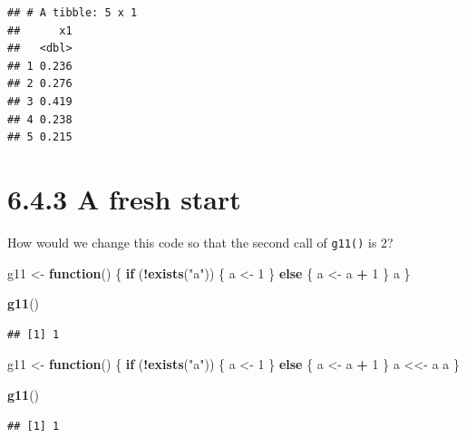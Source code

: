 \documentclass[]{book}
\newenvironment{Shaded}{\begin{snugshade}}{\end{snugshade}}
\newcommand{\ControlFlowTok}[1]{\textcolor[rgb]{0.13,0.29,0.53}{\textbf{#1}}}
\newcommand{\DecValTok}[1]{\textcolor[rgb]{0.00,0.00,0.81}{#1}}
\newcommand{\KeywordTok}[1]{\textcolor[rgb]{0.13,0.29,0.53}{\textbf{#1}}}
\newcommand{\NormalTok}[1]{#1}
\newcommand{\OperatorTok}[1]{\textcolor[rgb]{0.81,0.36,0.00}{\textbf{#1}}}
\newcommand{\StringTok}[1]{\textcolor[rgb]{0.31,0.60,0.02}{#1}}
\begin{document}
\begin{verbatim}
## # A tibble: 5 x 1
##      x1
##   <dbl>
## 1 0.236
## 2 0.276
## 3 0.419
## 4 0.238
## 5 0.215
\end{verbatim}

\hypertarget{a-fresh-start}{%
\section*{6.4.3 A fresh start}\label{a-fresh-start}}

How would we change this code so that the second call of \texttt{g11()} is 2?

\begin{Shaded}
\begin{Highlighting}[]
\NormalTok{g11 <-}\StringTok{ }\ControlFlowTok{function}\NormalTok{() \{}
  \ControlFlowTok{if}\NormalTok{ (}\OperatorTok{!}\KeywordTok{exists}\NormalTok{(}\StringTok{"a"}\NormalTok{)) \{}
\NormalTok{    a <-}\StringTok{ }\DecValTok{1}
\NormalTok{  \} }\ControlFlowTok{else}\NormalTok{ \{}
\NormalTok{    a <-}\StringTok{ }\NormalTok{a }\OperatorTok{+}\StringTok{ }\DecValTok{1}
\NormalTok{  \}}
\NormalTok{  a}
\NormalTok{\}}

\KeywordTok{g11}\NormalTok{()}
\end{Highlighting}
\end{Shaded}

\begin{verbatim}
## [1] 1
\end{verbatim}

\begin{Shaded}
\begin{Highlighting}[]
\NormalTok{g11 <-}\StringTok{ }\ControlFlowTok{function}\NormalTok{() \{}
  \ControlFlowTok{if}\NormalTok{ (}\OperatorTok{!}\KeywordTok{exists}\NormalTok{(}\StringTok{"a"}\NormalTok{)) \{}
\NormalTok{    a <-}\StringTok{ }\DecValTok{1}
\NormalTok{  \} }\ControlFlowTok{else}\NormalTok{ \{}
\NormalTok{    a <-}\StringTok{ }\NormalTok{a }\OperatorTok{+}\StringTok{ }\DecValTok{1}
\NormalTok{  \}}
\NormalTok{  a <<-}\StringTok{ }\NormalTok{a}
\NormalTok{  a}
\NormalTok{\}}

\KeywordTok{g11}\NormalTok{()}
\end{Highlighting}
\end{Shaded}

\begin{verbatim}
## [1] 1
\end{verbatim}
\end{document}
